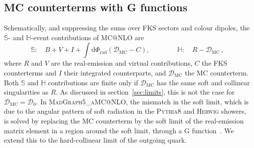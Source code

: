 \documentclass[a4paper,11pt]{article}
\makeatletter
\newcommand{\dd}{\mathrm{d}}
\newcommand{\mgamc}{\textsc{MadGraph5\_aMC@NLO}\xspace}
\newcommand{\mcatnlo}{MC@NLO\xspace}
\newcommand{\pythia}{\textsc{Pythia8}\xspace}
\newcommand{\clS}{\mathbb{S}}
\newcommand{\clH}{\mathbb{H}}
\newcommand{\Dens}{\mathcal{D}}
\makeatother
\begin{document}
\subsection{MC counterterms with G functions}
\label{sec:Gfunctions}

Schematically, and suppressing the sums over FKS sectors and colour
dipoles, the $\clS$- and $\clH$-event contributions of \mcatnlo
are~\cite{Frixione:2002ik,Alwall:2014hca}
\begin{equation}
  \clS:\quad B+V+I+\int\dd\Phi_{\mathrm{rad}}\left(\Dens_{\mathrm{MC}}-C\right),\qquad\qquad
  \clH:\quad R-\Dens_{\mathrm{MC}}\,,
  \label{eq:SH}
\end{equation}
where $R$ and $V$ are the real-emission and virtual contributions,
$C$ the FKS counterterms and $I$ their integrated counterparts, and
$\Dens_{\mathrm{MC}}$ the MC counterterm. Both $\clS$ and $\clH$
contributions are finite only if $\Dens_{\mathrm{MC}}$ has the same soft and
collinear singularities as $R$. As discussed in
section~\ref{sec:limits}, this is not the case for
$\Dens_{\mathrm{MC}}=\Dens_0$. In \mgamc, the mismatch in the
soft limit, which is due to the angular pattern of soft radiation in
the \pythia and \textsc{Herwig} showers, is solved by replacing the MC
counterterm by the soft limit of the real-emission matrix element in
a region around the soft limit, through a G
function~\cite{Alwall:2014hca}. We extend this to the hard-collinear
limit of the outgoing quark.
\end{document}
